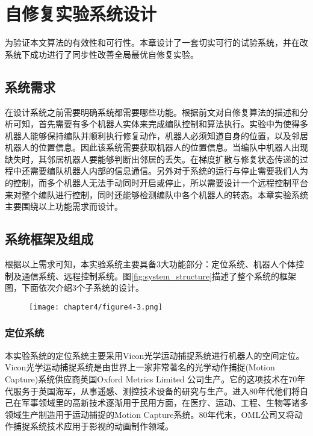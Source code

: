 \chapter{自修复实验系统设计}
为验证本文算法的有效性和可行性。本章设计了一套切实可行的试验系统，并在改系统下成功进行了同步性改善全局最优自修复实验。

\section{系统需求}
在设计系统之前需要明确系统都需要哪些功能。根据前文对自修复算法的描述和分析可知，首先需要有多个机器人实体来完成编队控制和算法执行。实验中为使得多机器人能够保持编队并顺利执行修复动作，机器人必须知道自身的位置，以及邻居机器人的位置信息。因此该系统需要获取机器人的位置信息。当编队中机器人出现缺失时，其邻居机器人要能够判断出邻居的丢失。在梯度扩散与修复状态传递的过程中还需要编队机器人内部的信息通信。另外对于系统的运行与停止需要我们人为的控制，而多个机器人无法手动同时开启或停止，所以需要设计一个远程控制平台来对整个编队进行控制，同时还能够检测编队中各个机器人的转态。本章实验系统主要围绕以上功能需求而设计。

\section{系统框架及组成}
根据以上需求可知，本实验系统主要具备3大功能部分：定位系统、机器人个体控制及通信系统、远程控制系统。图\ref{fig:system_structure}描述了整个系统的框架图，下面依次介绍3个子系统的设计。
\begin{figure}[!htbp]
	\centering
	\texttt{[image: chapter4/figure4-3.png]}
\end{figure}

\subsection{定位系统}
本实验系统的定位系统主要采用Vicon光学运动捕捉系统进行机器人的空间定位。Vicon光学运动捕捉系统是由世界上一家非常著名的光学动作捕捉(Motion Capture)系统供应商英国Oxford Metrics Limited 公司生产。它的这项技术在70年代服务于英国海军，从事遥感、测控技术设备的研究与生产。进入80年代他们将自己在军事领域里的高新技术逐渐用于民用方面，在医疗、运动、工程、生物等诸多领域生产制造用于运动捕捉的Motion Capture系统。80年代末，OML公司又将动作捕捉系统技术应用于影视的动画制作领域。
\begin{figure}[!htbp]
	\centering
\end{figure}

